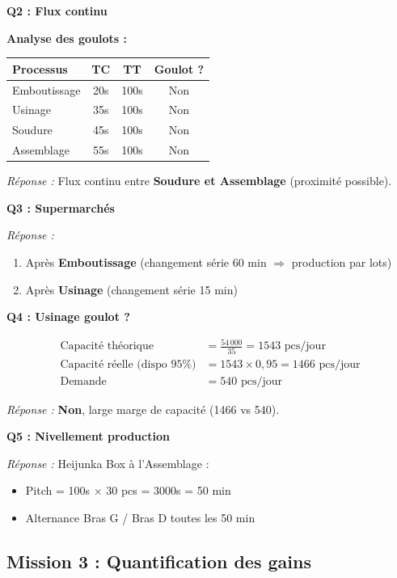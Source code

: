 \documentclass[12pt,a4paper]{article}
\begin{document}
\textbf{Q2 : Flux continu}

\textbf{Analyse des goulots :}
\begin{center}
\begin{tabular}{lccc}
\toprule
Processus & TC & TT & Goulot ? \\
\midrule
Emboutissage & 20s & 100s & Non \\
Usinage & 35s & 100s & Non \\
Soudure & 45s & 100s & Non \\
Assemblage & 55s & 100s & Non \\
\bottomrule
\end{tabular}
\end{center}

\textit{Réponse :} Flux continu entre \textbf{Soudure et Assemblage} (proximité possible).

\textbf{Q3 : Supermarchés}

\textit{Réponse :} 
\begin{enumerate}
    \item Après \textbf{Emboutissage} (changement série 60 min $\Rightarrow$ production par lots)
    \item Après \textbf{Usinage} (changement série 15 min)
\end{enumerate}

\textbf{Q4 : Usinage goulot ?}

\begin{align*}
    \text{Capacité théorique} &= \frac{54\,000}{35} = 1543 \text{ pcs/jour} \\
    \text{Capacité réelle (dispo 95\%)} &= 1543 \times 0{,}95 = 1466 \text{ pcs/jour} \\
    \text{Demande} &= 540 \text{ pcs/jour}
\end{align*}

\textit{Réponse :} \textbf{Non}, large marge de capacité (1466 vs 540).

\textbf{Q5 : Nivellement production}

\textit{Réponse :} Heijunka Box à l'Assemblage :
\begin{itemize}
    \item Pitch = 100s × 30 pcs = 3000s = 50 min
    \item Alternance Bras G / Bras D toutes les 50 min
\end{itemize}

\subsection{Mission 3 : Quantification des gains}
\end{document}
